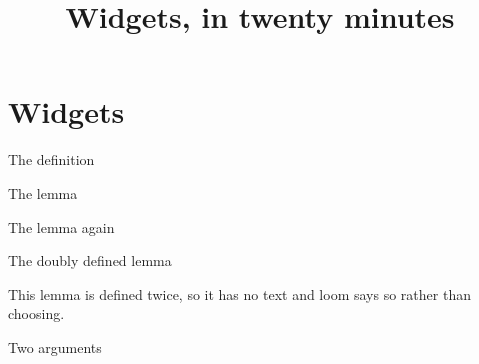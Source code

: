 \documentclass{beamer}
\title{Widgets, in twenty minutes}
\theoremstyle{definition}
\begin{document}
\begin{frame}
\titlepage
\end{frame}

\section{Widgets}\label{sy-0400}

\begin{frame}{The definition}

\end{frame}

\begin{frame}{The lemma}

\end{frame}

\begin{frame}{The lemma again}

\end{frame}

\begin{frame}{The doubly defined lemma}
\begin{lemma}\label{sy-999E}
This lemma is defined twice, so it has no text and loom says so rather than choosing.
\end{lemma}
\end{frame}

\begin{frame}{Two arguments}

\end{frame}
\end{document}
